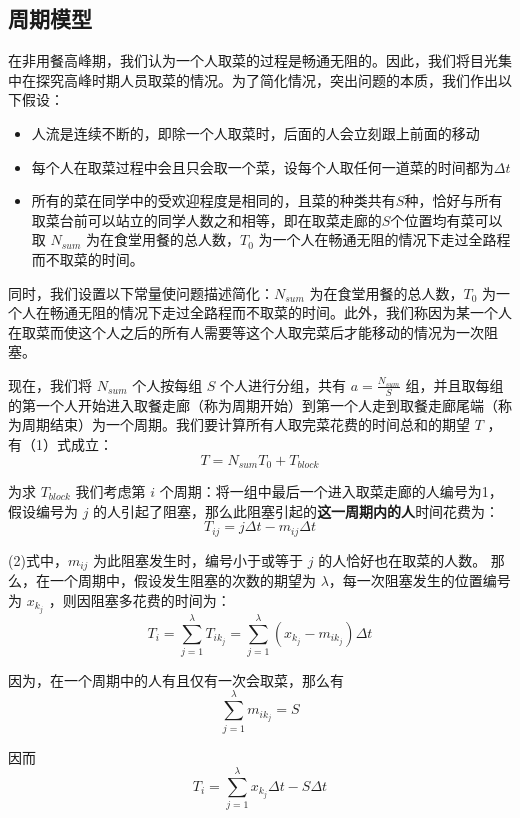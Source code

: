 \documentclass[lang=cn,10pt,a4paper]{elegantpaper}
\begin{document}
\subsection{周期模型}
在非用餐高峰期，我们认为一个人取菜的过程是畅通无阻的。因此，我们将目光集中在探究高峰时期人员取菜的情况。为了简化情况，突出问题的本质，我们作出以下假设：
\begin{itemize}
\item 人流是连续不断的，即除一个人取菜时，后面的人会立刻跟上前面的移动
\item 每个人在取菜过程中会且只会取一个菜，设每个人取任何一道菜的时间都为$\Delta t$
\item 所有的菜在同学中的受欢迎程度是相同的，且菜的种类共有$S$种，恰好与所有取菜台前可以站立的同学人数之和相等，即在取菜走廊的$S$个位置均有菜可以取
$N_{sum}$ 为在食堂用餐的总人数，$T_{0}$ 为一个人在畅通无阻的情况下走过全路程而不取菜的时间。
\end{itemize}


同时，​我们设置以下常量使问题描述简化：$N_{sum}$ 为在食堂用餐的总人数，$T_{0}$ 为一个人在畅通无阻的情况下走过全路程而不取菜的时间。此外，我们称因为某一个人在取菜而使这个人之后的所有人需要等这个人取完菜后才能移动的情况为一次阻塞。


​现在，我们将 $N_{sum}$ 个人按每组 $S$ 个人进行分组，共有 $a = \frac{N_{sum}}{S}$ 组，并且取每组的第一个人开始进入取餐走廊（称为周期开始）到第一个人走到取餐走廊尾端（称为周期结束）为一个周期。我们要计算所有人取完菜花费的时间总和的期望 $T$ ，有（1）式成立：
\begin{equation}
T = N_{sum}T_0+ T_{block}
\end{equation}


​为求 $T_{block}$ 我们考虑第 $i$ 个周期：将一组中最后一个进入取菜走廊的人编号为1，假设编号为 $j$ 的人引起了阻塞，那么此阻塞引起的\textbf{这一周期内的人}时间花费为：
\begin{equation}
T_{ij}=j\Delta t -m_{ij} \Delta t
\end{equation}


(2)式中，$m_{ij}$ 为此阻塞发生时，编号小于或等于 $j$ 的人恰好也在取菜的人数。
那么，在一个周期中，假设发生阻塞的次数的期望为 $\lambda$，每一次阻塞发生的位置编号为 $x_{k_j}$ ，则因阻塞多花费的时间为：
$$
T_{i} = \sum_{j=1}^{\lambda} T_{ik_j}= \sum_{j=1}^{\lambda}{(x_{k_j}-m_{ik_j})\Delta t}
$$


​因为，在一个周期中的人有且仅有一次会取菜，那么有
$$
\sum_{j=1}^{\lambda}m_{ik_j}=S
$$


因而
$$
T_i=\sum_{j=1}^{\lambda}x_{k_j}\Delta t -S\Delta t
$$
\end{document}
